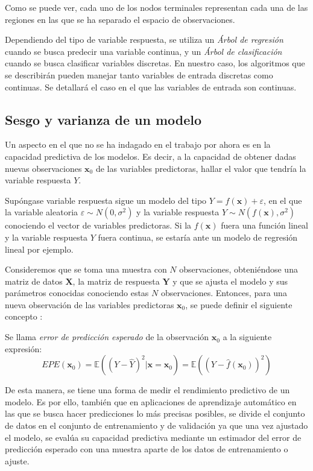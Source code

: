 \noindent Como se puede ver, cada uno de los nodos terminales representan cada una de las regiones en las que se ha separado el espacio de observaciones. 

\noindent Dependiendo del tipo de variable respuesta, se utiliza un \emph{Árbol de regresión} cuando se busca predecir una variable continua, y un \emph{Árbol de clasificación} cuando se busca clasificar variables discretas. En nuestro caso, los algoritmos que se describirán pueden manejar tanto variables de entrada discretas como continuas. Se detallará el caso en el que las variables de entrada son continuas.

\subsection*{Sesgo y varianza de un modelo}

\noindent Un aspecto en el que no se ha indagado en el trabajo por ahora es en la capacidad predictiva de los modelos. Es decir, a la capacidad de obtener dadas nuevas observaciones $\mathbf{x}_0$ de las variables predictoras, hallar el valor que tendría la variable respuesta $Y$. 

\noindent Supóngase variable respuesta sigue un modelo del tipo $Y=f(\mathbf{x})+\varepsilon$, en el que la variable aleatoria $\varepsilon\sim N(0,\sigma^2)$ y la variable respuesta $Y\sim N(f(\mathbf{x}),\sigma^2)$ conociendo el vector de variables predictoras. Si la $f(\mathbf{x})$ fuera una función lineal y la variable respuesta $Y$ fuera continua, se estaría ante un modelo de regresión lineal por ejemplo. 

\noindent Consideremos que se toma una muestra con  $N$ observaciones, obteniéndose una matriz de datos $\mathbf{X}$, la matriz de respuesta $\mathbf{Y}$ y que se ajusta el modelo y sus parámetros conocidas conociendo estas $N$ observaciones. Entonces, para una nueva observación de las variables predictoras $\mathbf{x}_0$, se puede definir el siguiente concepto \cite{Hastie 2001, Lawless 2010}:

\begin{defi}
Se llama \emph{error de predicción esperado} de la observación $\mathbf{x}_0$ a la siguiente expresión:
\begin{equation}
EPE(\mathbf{x}_0)=\mathbb{E}((Y-\hat{Y})^2|\mathbf{x}=\mathbf{x}_0)=\mathbb{E}((Y-\hat{f}(\mathbf{x}_0))^2)
\end{equation}
\end{defi}
\noindent De esta manera, se tiene una forma de medir el rendimiento predictivo de un modelo. Es por ello, también que en aplicaciones de aprendizaje automático en las que se busca hacer predicciones lo más precisas posibles, se divide el conjunto de datos en el conjunto de entrenamiento y de validación ya que una vez ajustado el modelo, se evalúa su capacidad predictiva mediante un estimador del error de predicción esperado con una muestra aparte de los datos de entrenamiento o ajuste.

